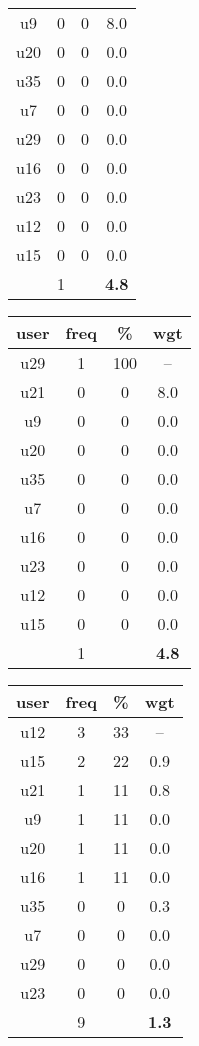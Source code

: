 \begin{appendices}
\begin{table}
\begin{tabular}{ |c|c|c|c| }
	u9 & 0 & 0 & 8.0 \\
	u20 & 0 & 0 & 0.0 \\
	u35 & 0 & 0 & 0.0 \\
	u7 & 0 & 0 & 0.0 \\
	u29 & 0 & 0 & 0.0 \\
	u16 & 0 & 0 & 0.0 \\
	u23 & 0 & 0 & 0.0 \\
	u12 & 0 & 0 & 0.0 \\
	u15 & 0 & 0 & 0.0 \\
	 & 1 & & \textbf{4.8} \\
	\hline
\end{tabular}
\begin{tabular}{ |c|c|c|c| }
	\hline
	\textbf{user} & \textbf{freq} & \textbf{\%} & \textbf{wgt} \\
	\hline
	u29 & 1 & 100 & -- \\
	u21 & 0 & 0 & 8.0 \\
	u9 & 0 & 0 & 0.0 \\
	u20 & 0 & 0 & 0.0 \\
	u35 & 0 & 0 & 0.0 \\
	u7 & 0 & 0 & 0.0 \\
	u16 & 0 & 0 & 0.0 \\
	u23 & 0 & 0 & 0.0 \\
	u12 & 0 & 0 & 0.0 \\
	u15 & 0 & 0 & 0.0 \\
	 & 1 & & \textbf{4.8} \\
	\hline
\end{tabular}
\begin{tabular}{ |c|c|c|c| }
	\hline
	\textbf{user} & \textbf{freq} & \textbf{\%} & \textbf{wgt} \\
	\hline
	u12 & 3 & 33 & -- \\
	u15 & 2 & 22 & 0.9 \\
	u21 & 1 & 11 & 0.8 \\
	u9 & 1 & 11 & 0.0 \\
	u20 & 1 & 11 & 0.0 \\
	u16 & 1 & 11 & 0.0 \\
	u35 & 0 & 0 & 0.3 \\
	u7 & 0 & 0 & 0.0 \\
	u29 & 0 & 0 & 0.0 \\
	u23 & 0 & 0 & 0.0 \\
	 & 9 & & \textbf{1.3} \\
	\hline
\end{tabular}

\end{table}
\end{appendices}
